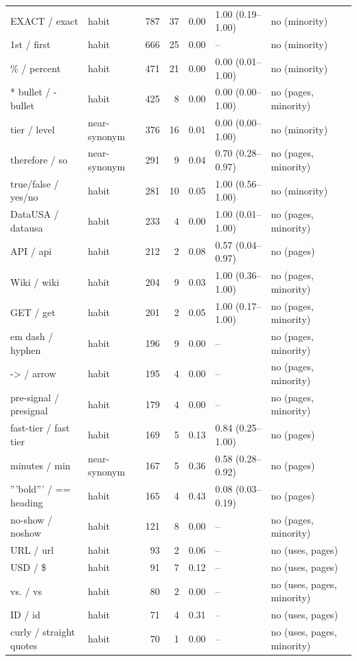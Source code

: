 \begin{tabular}{llrrrll}
EXACT / exact & habit & 787 & 37 & 0.00 & 1.00 (0.19--1.00) & no (minority) \\
1st / first & habit & 666 & 25 & 0.00 & -- & no (minority) \\
\% / percent & habit & 471 & 21 & 0.00 & 0.00 (0.01--1.00) & no (minority) \\
* bullet / - bullet & habit & 425 & 8 & 0.00 & 0.00 (0.00--1.00) & no (pages, minority) \\
tier / level & near-synonym & 376 & 16 & 0.01 & 0.00 (0.00--1.00) & no (minority) \\
therefore / so & near-synonym & 291 & 9 & 0.04 & 0.70 (0.28--0.97) & no (pages, minority) \\
true/false / yes/no & habit & 281 & 10 & 0.05 & 1.00 (0.56--1.00) & no (minority) \\
DataUSA / datausa & habit & 233 & 4 & 0.00 & 1.00 (0.01--1.00) & no (pages, minority) \\
API / api & habit & 212 & 2 & 0.08 & 0.57 (0.04--0.97) & no (pages) \\
Wiki / wiki & habit & 204 & 9 & 0.03 & 1.00 (0.36--1.00) & no (pages, minority) \\
GET / get & habit & 201 & 2 & 0.05 & 1.00 (0.17--1.00) & no (pages, minority) \\
em dash / hyphen & habit & 196 & 9 & 0.00 & -- & no (pages, minority) \\
-> / arrow & habit & 195 & 4 & 0.00 & -- & no (pages, minority) \\
pre-signal / presignal & habit & 179 & 4 & 0.00 & -- & no (pages, minority) \\
fast-tier / fast tier & habit & 169 & 5 & 0.13 & 0.84 (0.25--1.00) & no (pages) \\
minutes / min & near-synonym & 167 & 5 & 0.36 & 0.58 (0.28--0.92) & no (pages) \\
'''bold''' / == heading & habit & 165 & 4 & 0.43 & 0.08 (0.03--0.19) & no (pages) \\
no-show / noshow & habit & 121 & 8 & 0.00 & -- & no (pages, minority) \\
URL / url & habit & 93 & 2 & 0.06 & -- & no (uses, pages) \\
USD / \$ & habit & 91 & 7 & 0.12 & -- & no (uses, pages) \\
vs. / vs & habit & 80 & 2 & 0.00 & -- & no (uses, pages, minority) \\
ID / id & habit & 71 & 4 & 0.31 & -- & no (uses, pages) \\
curly / straight quotes & habit & 70 & 1 & 0.00 & -- & no (uses, pages, minority) \\

\end{tabular}
